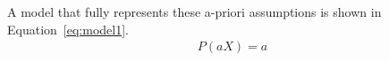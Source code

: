 A model that fully represents these a-priori assumptions is shown in Equation~\ref{eq:model1}.
\begin{align}
    P(aX) = a
\end{align}
